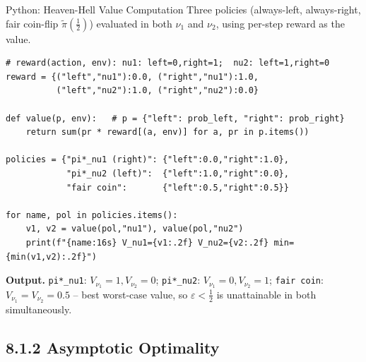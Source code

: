 \documentclass[aspectratio=169,10pt]{beamer}
\begin{document}
\begin{frame}[fragile]{Python: Heaven-Hell Value Computation}
  Three policies (always-left, always-right, fair coin-flip
  $\tilde\pi(\tfrac12)$) evaluated in both $\nu_1$ and $\nu_2$, using
  per-step reward as the value.

\begin{lstlisting}[style=pythonstyle]
# reward(action, env): nu1: left=0,right=1;  nu2: left=1,right=0
reward = {("left","nu1"):0.0, ("right","nu1"):1.0,
          ("left","nu2"):1.0, ("right","nu2"):0.0}

def value(p, env):   # p = {"left": prob_left, "right": prob_right}
    return sum(pr * reward[(a, env)] for a, pr in p.items())

policies = {"pi*_nu1 (right)": {"left":0.0,"right":1.0},
            "pi*_nu2 (left)":  {"left":1.0,"right":0.0},
            "fair coin":       {"left":0.5,"right":0.5}}

for name, pol in policies.items():
    v1, v2 = value(pol,"nu1"), value(pol,"nu2")
    print(f"{name:16s} V_nu1={v1:.2f} V_nu2={v2:.2f} min={min(v1,v2):.2f}")
\end{lstlisting}

  \textbf{Output.} \texttt{pi*\_nu1}: $V_{\nu_1}=1,V_{\nu_2}=0$;
  \texttt{pi*\_nu2}: $V_{\nu_1}=0,V_{\nu_2}=1$; \texttt{fair coin}:
  $V_{\nu_1}=V_{\nu_2}=0.5$ -- best worst-case value, so
  $\varepsilon<\tfrac12$ is unattainable in both simultaneously.
\end{frame}

\subsection{8.1.2 Asymptotic Optimality}
\end{document}
